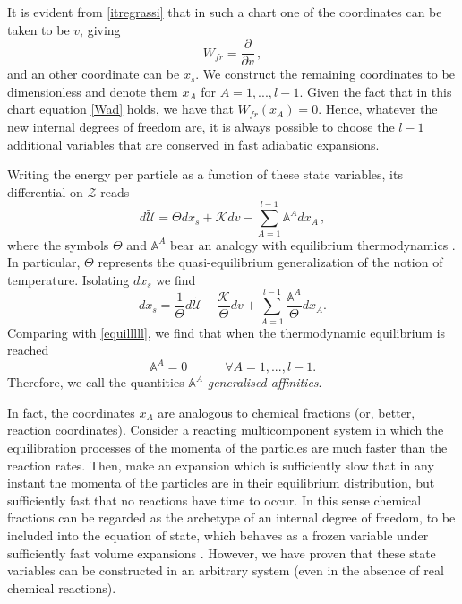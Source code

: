 \documentclass[useAMS,usenatbib,prd,twocolumn,nofootinbib]{revtex4-1}
\newcommand{\spc}{\quad \quad \quad}
\begin{document}
It is evident from \eqref{itregrassi} that in such a chart one of the coordinates can be taken to be $v$, giving
\begin{equation}\label{Wad}
W_{fr} = \dfrac{\partial}{\partial v} \, ,
\end{equation}
and an other coordinate can be $x_s$. 
We construct the remaining coordinates to be dimensionless and denote them $x_A$ for $A=1,...,l-1$. Given the fact that in this chart equation \eqref{Wad} holds, we have that $W_{fr}(x_A)=0$. Hence, whatever the new internal degrees of freedom are, it is always possible to choose the $l-1$ additional variables that are conserved in fast adiabatic expansions.

Writing the energy per particle as a function of these state variables, its differential on $\mathcal{Z}$ reads
\begin{equation}\label{EOS}
d \tilde{\mathcal{U}} =\Theta dx_s + \mathcal{K} dv  - \sum_{A=1}^{l-1} \mathbb{A}^A d x_A \, ,
\end{equation}
where the symbols $\Theta$ and $\mathbb{A}^A$ bear an analogy with equilibrium thermodynamics \citep{Termo}. 
In particular, $\Theta$ represents the quasi-equilibrium generalization of the notion of temperature. 
Isolating $dx_s$ we find
\begin{equation}\label{entrppia}
dx_s = \dfrac{1}{\Theta} d\tilde{\mathcal{U}} - \dfrac{\mathcal{K}}{\Theta} d v +  \sum_{A=1}^{l-1} \dfrac{\mathbb{A}^A}{\Theta} dx_A .
\end{equation}
Comparing with \eqref{equilllll}, we find that when the thermodynamic equilibrium is reached
\begin{equation}
\mathbb{A}^A =0  \spc \forall A =1,...,l-1.
\end{equation} 
Therefore, we call the quantities $\mathbb{A}^A$ \textit{generalised affinities}.

In fact, the coordinates $x_A$ are analogous to chemical fractions (or, better, reaction coordinates). Consider a reacting multicomponent system in which the equilibration processes of the momenta of the particles are much faster than the reaction rates. Then, make an expansion which is sufficiently slow that in any instant the momenta of the particles are in their equilibrium distribution, but sufficiently fast that no reactions have time to occur. In this sense chemical fractions can be regarded as the archetype of an internal degree of freedom, to be included into the equation of state, which behaves as a frozen variable under sufficiently fast volume expansions  \cite[see e.g.][]{haensel_frozen}. 
However, we have proven that these state variables can be constructed in an arbitrary system (even in the absence of real chemical reactions). 
\end{document}
